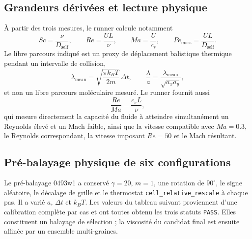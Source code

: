 \documentclass[11pt,a4paper]{article}
\begin{document}
\subsection{Grandeurs dérivées et lecture physique}

À partir des trois mesures, le runner calcule notamment
\begin{equation}
  Sc=\frac{\nu}{D_{\mathrm{self}}},
  \qquad
  Re=\frac{UL}{\nu},
  \qquad
  Ma=\frac{U}{c_s},
  \qquad
  Pe_{\mathrm{mass}}=\frac{UL}{D_{\mathrm{self}}}.
\end{equation}
Le libre parcours indiqué est un proxy de déplacement balistique thermique pendant un intervalle de collision,
\begin{equation}
  \lambda_{\mathrm{mean}}=\sqrt{\frac{\pi k_BT}{2m}}\,\Delta t,
  \qquad
  \frac{\lambda}{a}=\frac{\lambda_{\mathrm{mean}}}{\sqrt{a_xa_y}},
\end{equation}
et non un libre parcours moléculaire mesuré. Le runner fournit aussi
\begin{equation}
  \frac{Re}{Ma}=\frac{c_sL}{\nu},
\end{equation}
qui mesure directement la capacité du fluide à atteindre simultanément un Reynolds élevé et un Mach faible, ainsi que la vitesse compatible avec $Ma=0.3$, le Reynolds correspondant, la vitesse imposant $Re=50$ et le Mach résultant.

\subsection{Pré-balayage physique de six configurations}

Le pré-balayage 0493w1 a conservé $\gamma=20$, $m=1$, une rotation de $90^\circ$, le signe aléatoire, le décalage de grille et le thermostat \texttt{cell\_relative\_rescale} à chaque pas. Il a varié $a$, $\Delta t$ et $k_BT$. Les valeurs du tableau suivant proviennent d'une calibration complète par cas et ont toutes obtenu les trois statuts \texttt{PASS}. Elles constituent un balayage de sélection ; la viscosité du candidat final est ensuite affinée par un ensemble multi-graines.
\end{document}
